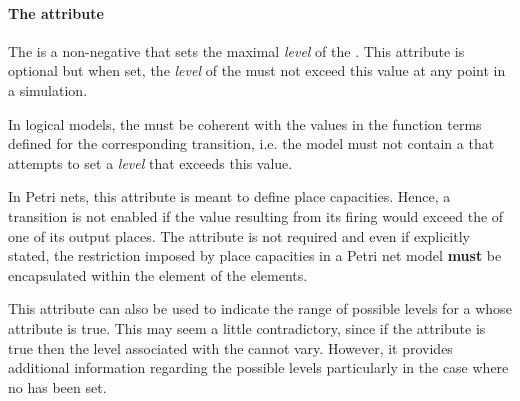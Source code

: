 \paragraph{The  attribute}
The  is a non-negative  that sets the maximal \emph{level} of the . This attribute is optional but when set, the \emph{level} of the \QualitativeSpecies must not exceed this value at any point in a simulation.

In logical models, the  must be coherent with the  values in the function terms defined for the corresponding transition, i.e. the model must not contain a \FunctionTerm that attempts to set a \emph{level} that exceeds this value.

In Petri nets, this attribute is meant to define place capacities. Hence, a transition is not enabled if the value resulting from its firing would exceed the   of one of its output places.  The attribute is not required and even if explicitly stated, the restriction imposed by place capacities in a Petri net model  \textbf{must} be encapsulated within the  element of the \FunctionTerm elements. 

This attribute can also be used to indicate the range of possible levels for a \QualitativeSpecies whose  attribute is true. This may seem a little contradictory, since if the  attribute is true then the level associated with the \QualitativeSpecies cannot vary. However, it provides additional information regarding the possible levels particularly in the case where no  has been set.

